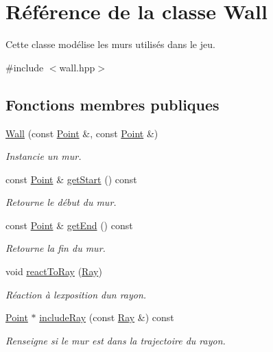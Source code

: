 \hypertarget{classWall}{}\section{Référence de la classe Wall}
\label{classWall}


Cette classe modélise les murs utilisés dans le jeu.  




{\ttfamily \#include $<$wall.\+hpp$>$}

\subsection*{Fonctions membres publiques}
\begin{DoxyCompactItemize}
\item 
\hyperlink{classWall_aa9e4665888cfb76c5700fcd9f8672771}{Wall} (const \hyperlink{classPoint}{Point} \&, const \hyperlink{classPoint}{Point} \&)
\begin{DoxyCompactList}\small\item\em Instancie un mur. \end{DoxyCompactList}\item 
const \hyperlink{classPoint}{Point} \& \hyperlink{classWall_af21a88dc50de229830bbfe68f088e5f2}{get\+Start} () const 
\begin{DoxyCompactList}\small\item\em Retourne le début du mur. \end{DoxyCompactList}\item 
const \hyperlink{classPoint}{Point} \& \hyperlink{classWall_aeae40b7ecf22bd44dc75382bafad24c8}{get\+End} () const 
\begin{DoxyCompactList}\small\item\em Retourne la fin du mur. \end{DoxyCompactList}\item 
void \hyperlink{classWall_a4167a9d310ff17cf02d232d4f384b77d}{react\+To\+Ray} (\hyperlink{classRay}{Ray})
\begin{DoxyCompactList}\small\item\em Réaction à l\textquotesingle{}exposition d\textquotesingle{}un rayon. \end{DoxyCompactList}\item 
\hyperlink{classPoint}{Point} $\ast$ \hyperlink{classWall_a11178e8dc8eabc9a56b9bf5525dc4f29}{include\+Ray} (const \hyperlink{classRay}{Ray} \&) const 
\begin{DoxyCompactList}\small\item\em Renseigne si le mur est dans la trajectoire du rayon. \end{DoxyCompactList}\item 

\end{DoxyCompactItemize}
